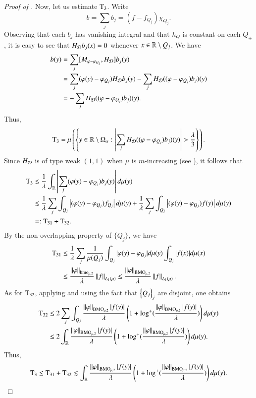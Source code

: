 \documentclass[leqno]{amsart}
\begin{document}
\begin{proof}[Proof of ]
Now, let us estimate ${\rm T}_{3}$. Write 
$$b=\sum_{j}b_{j}=(f-f_{Q_{j}})\chi_{Q_{j}}.$$
Observing that each $b_{j}$ has vanishing integral and that $h_{Q}$ is constant on each $Q_{\pm}$, it is easy to see that $H_{{\mathcal D}}b_{j}(x)=0$ whenever $x\in {\mathbb R}\setminus Q_{j}$. We have
\begin{align*}
[M_{\varphi},H_{\D}]b(y)&=\sum_{j}[M_{\varphi-\varphi_{Q_{j}}},H_{\D}]b_{j}(y)\\
&=\sum_{j}(\varphi(y)-\varphi_{Q_{j}})H_{\D}b_{j}(y)-\sum_{j}H_{\D}((\varphi-\varphi_{Q_{j}})b_{j})(y)\\
&=-\sum_{j}H_{\D}((\varphi-\varphi_{Q_{j}})b_{j})(y).
\end{align*}
Thus,
\begin{align*}
{\rm T}_{3}=
\mu\left(\set{y\in\RR\setminus\Omega_{\alpha}:\left|\sum_{j}H_{\D}((\varphi-\varphi_{Q_{j}})b_{j})(y)\right|>\frac{\lambda}{3}}\right).
\end{align*}
Since $H_{{\mathcal D}}$ is of type weak $(1,1)$ when $\mu$ is $m$-increasing (see \cite[Theorem 2.5]{LMP2014}), it follows that
\begin{align*}
{\rm T}_{3}
&\lesssim\frac{1}{\lambda}\int_{{\mathbb R}}\left|\sum_{j}(\varphi(y)-\varphi_{Q_{j}})b_{j}(y)\right|d\mu(y)\\
&\lesssim\frac{1}{\lambda}\sum_{j}\int_{Q_{j}}\left|(\varphi(y)-\varphi_{Q_{j}})f_{Q_{j}}\right|d\mu(y)
+\frac{1}{\lambda}\sum_{j}\int_{Q_{j}}\left|(\varphi(y)-\varphi_{Q_{j}})f(y)\right|d\mu(y)\\
&=:{\rm T}_{31}+{\rm T}_{32}.
\end{align*}
By the non-overlapping property of $\{Q_{j}\}$, we have
\begin{align*}%
{\rm T}_{31}
&\leq\frac{1}{\lambda}\sum_{j}\frac{1}{\mu(Q_{j})}\int_{Q_{j}}|\varphi(y)-\varphi_{Q_{j}}|d\mu(y)
\int_{Q_{j}}|f(x)|d\mu(x)\\
&\leq\frac{\Norm{\varphi}_{\bmo_{\mu,2}}}{\lambda}\Norm{f}_{L_{1}(\mu)}\leq \frac{\Norm{\varphi}_{\BMO_{\mu,2}}}{\lambda}\Norm{f}_{L_{1}(\mu)}.
\end{align*}
As for ${\rm T}_{32}$, applying  and using the fact that $\left\{ Q_{j} \right\}_{j}$ are disjoint, one obtains
\begin{align*}%
{\rm T}_{32}&\leq2
\sum_{j}\int_{Q_{j}}\frac{\Norm{\varphi}_{\BMO_{\mu,2}}|f(y)|}{\lambda}
\left(1+\log^{+}(\frac{\Norm{\varphi}_{\BMO_{\mu,2}}|f(y)|}{\lambda})\right)d\mu(y)\\
&\leq2\int_{\RR}\frac{\Norm{\varphi}_{\BMO_{\mu,2}}|f(y)|}{\lambda}
\left(1+\log^{+}(\frac{\Norm{\varphi}_{\BMO_{\mu,2}}|f(y)|}{\lambda})\right)d\mu(y).
\end{align*}
Thus, 
\begin{align*}
{\rm T}_{3}\leq {\rm T}_{31}+{\rm T}_{32}\lesssim
\int_{{\mathbb R}}\frac{\left\| \varphi \right\|_{{\rm BMO}_{\mu,2}}|f(y)|}{\lambda}\left(1+\log^{+}(\frac{\left\| \varphi \right\|_{{\rm BMO}_{\mu,2}}|f(y)|}{\lambda})\right)d\mu(y).
\end{align*}



\end{proof}
\end{document}
